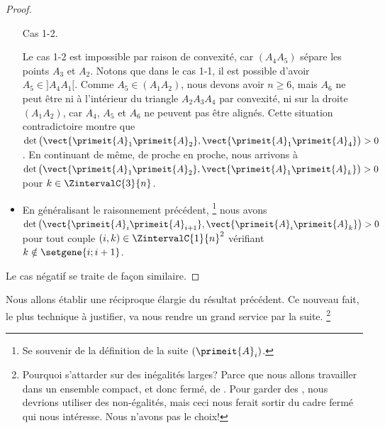 \begin{proof}
\begin{itemize}
\begin{multicols}{2}
        	\smallskip
            Cas 1-2.
        \end{multicols}
    
		\noindent
		Le cas 1-2 est impossible par raison de convexité, car $(A_4 A_5)$ sépare les points $A_3$ et $A_2$.
		Notons que dans le cas 1-1, il est possible d'avoir $A_5 \in {]A_4 A_1[}$.
		Comme $A_5 \in (A_1 A_2)$, nous devons avoir $n \geq 6$, 
		mais $A_6$ ne peut être ni à l'intérieur du triangle $A_2 A_3 A_4$ par convexité,
		ni sur la droite $(A_1 A_2)$, car $A_4$, $A_5$ et $A_6$ ne peuvent pas être alignés.
		Cette situation contradictoire montre que
		$\det \big( \vect{\primeit{A}_1 \primeit{A}_2}, \vect{\primeit{A}_1 \primeit{A}_4} \big) > 0$.
		En continuant de même, de proche en proche, nous arrivons à
		$\det \big( \vect{\primeit{A}_1 \primeit{A}_2}, \vect{\primeit{A}_1 \primeit{A}_k} \big) > 0$
		pour $k \in \ZintervalC{3}{n}$.


		\item En généralisant le raisonnement précédent,%
		\footnote{
		    Se souvenir de la définition  de la suite $(\primeit{A}_i)$.
		}
		nous avons
		$\det \big( \vect{\primeit{A}_i \primeit{A}_{i+1}}, \vect{\primeit{A}_i \primeit{A}_k} \big) > 0$
		pour tout couple $(i, k) \in \ZintervalC{1}{n}^2$ vérifiant $k \notin \setgene{i ; i+1}$.
	\end{itemize}

    \medskip
    
    \noindent
    Le cas négatif se traite de façon similaire.
\end{proof}




Nous allons établir une réciproque élargie du résultat précédent. Ce nouveau fait, le plus technique à justifier, va nous rendre un grand service par la suite.%
\footnote{
    Pourquoi s'attarder sur des inégalités larges? Parce que nous allons travailler dans un ensemble compact, et donc fermé, de \ncycles.
    Pour garder des \ngones, nous devrions utiliser des non-égalités, mais ceci nous ferait sortir du cadre fermé qui nous intéresse.
    Nous n'avons pas le choix!
}


